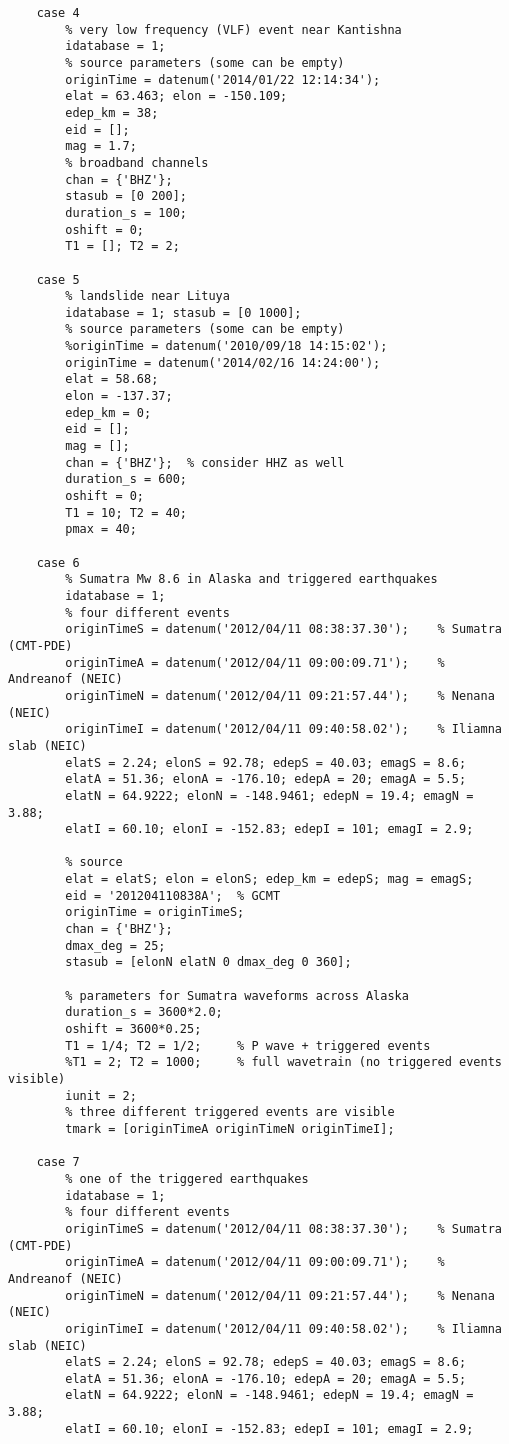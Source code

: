 \documentclass[11pt,titlepage,fleqn]{article}
\begin{document}
\begin{spacing}{1.0}
\begin{verbatim}
    case 4
        % very low frequency (VLF) event near Kantishna
        idatabase = 1;
        % source parameters (some can be empty)
        originTime = datenum('2014/01/22 12:14:34');
        elat = 63.463; elon = -150.109;
        edep_km = 38;
        eid = [];
        mag = 1.7;
        % broadband channels
        chan = {'BHZ'};
        stasub = [0 200];
        duration_s = 100; 
        oshift = 0;
        T1 = []; T2 = 2;
        
    case 5
        % landslide near Lituya
        idatabase = 1; stasub = [0 1000];
        % source parameters (some can be empty)
        %originTime = datenum('2010/09/18 14:15:02');
        originTime = datenum('2014/02/16 14:24:00');
        elat = 58.68;
        elon = -137.37;
        edep_km = 0;
        eid = [];
        mag = [];
        chan = {'BHZ'};  % consider HHZ as well
        duration_s = 600;
        oshift = 0;
        T1 = 10; T2 = 40;
        pmax = 40;
        
    case 6
        % Sumatra Mw 8.6 in Alaska and triggered earthquakes
        idatabase = 1;
        % four different events
        originTimeS = datenum('2012/04/11 08:38:37.30');    % Sumatra (CMT-PDE)
        originTimeA = datenum('2012/04/11 09:00:09.71');    % Andreanof (NEIC)
        originTimeN = datenum('2012/04/11 09:21:57.44');    % Nenana (NEIC)
        originTimeI = datenum('2012/04/11 09:40:58.02');    % Iliamna slab (NEIC)
        elatS = 2.24; elonS = 92.78; edepS = 40.03; emagS = 8.6;
        elatA = 51.36; elonA = -176.10; edepA = 20; emagA = 5.5;
        elatN = 64.9222; elonN = -148.9461; edepN = 19.4; emagN = 3.88;
        elatI = 60.10; elonI = -152.83; edepI = 101; emagI = 2.9;
        
        % source
        elat = elatS; elon = elonS; edep_km = edepS; mag = emagS;
        eid = '201204110838A';  % GCMT
        originTime = originTimeS;
        chan = {'BHZ'};
        dmax_deg = 25;
        stasub = [elonN elatN 0 dmax_deg 0 360];

        % parameters for Sumatra waveforms across Alaska
        duration_s = 3600*2.0;
        oshift = 3600*0.25;
        T1 = 1/4; T2 = 1/2;     % P wave + triggered events
        %T1 = 2; T2 = 1000;     % full wavetrain (no triggered events visible)
        iunit = 2;
        % three different triggered events are visible
        tmark = [originTimeA originTimeN originTimeI];
        
    case 7
        % one of the triggered earthquakes
        idatabase = 1;
        % four different events
        originTimeS = datenum('2012/04/11 08:38:37.30');    % Sumatra (CMT-PDE)
        originTimeA = datenum('2012/04/11 09:00:09.71');    % Andreanof (NEIC)
        originTimeN = datenum('2012/04/11 09:21:57.44');    % Nenana (NEIC)
        originTimeI = datenum('2012/04/11 09:40:58.02');    % Iliamna slab (NEIC)
        elatS = 2.24; elonS = 92.78; edepS = 40.03; emagS = 8.6;
        elatA = 51.36; elonA = -176.10; edepA = 20; emagA = 5.5;
        elatN = 64.9222; elonN = -148.9461; edepN = 19.4; emagN = 3.88;
        elatI = 60.10; elonI = -152.83; edepI = 101; emagI = 2.9;
        

\end{verbatim}
\end{spacing}
\end{document}
